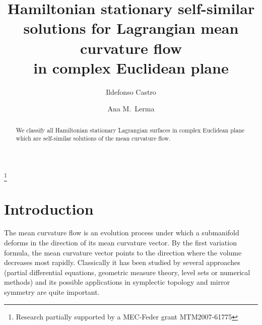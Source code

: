 \documentclass[leqno,11pt]{amsart}
\begin{document}
\title[HSL self-similar solutions to MCF]{Hamiltonian stationary self-similar solutions for Lagrangian mean curvature flow
\\ in complex Euclidean plane}

\author{Ildefonso Castro}
\address{Departamento de Matem\'{a}ticas \\
Universidad de Ja\'{e}n \\
23071 Ja\'{e}n, SPAIN} 

\author{Ana M.~Lerma}
\address{Departamento de Matem\'{a}ticas \\
Universidad de Ja\'{e}n \\
23071 Ja\'{e}n, SPAIN} 

\thanks{Research partially supported by a MEC-Feder grant MTM2007-61775}



\date{}

\date{}

\begin{abstract}
We classify all Hamiltonian stationary Lagrangian surfaces in
complex Euclidean plane which are self-similar solutions of the
mean curvature flow.
\end{abstract}

\maketitle

\section{Introduction}
The mean curvature flow is an evolution process under which a
submanifold deforms in the direction of its mean curvature vector.
By the first variation formula, the mean curvature vector points
to the direction where the volume decreases most rapidly.
Classically it has been studied by several approaches (partial
differential equations, geometric measure theory, level sets or
numerical methods) and its possible applications in symplectic
topology and mirror symmetry are quite important.
\end{document}
